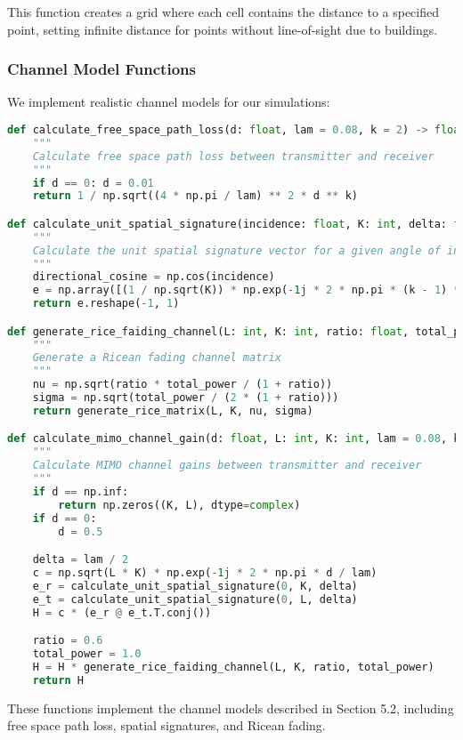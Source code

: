 This function creates a grid where each cell contains the distance to a specified point, setting infinite distance for points without line-of-sight due to buildings.

\subsubsection{Channel Model Functions}

We implement realistic channel models for our simulations:

\begin{lstlisting}[language=python, caption={Channel Modeling Functions}]
def calculate_free_space_path_loss(d: float, lam = 0.08, k = 2) -> float:
    """
    Calculate free space path loss between transmitter and receiver
    """
    if d == 0: d = 0.01
    return 1 / np.sqrt((4 * np.pi / lam) ** 2 * d ** k)

def calculate_unit_spatial_signature(incidence: float, K: int, delta: float):
    """
    Calculate the unit spatial signature vector for a given angle of incidence
    """
    directional_cosine = np.cos(incidence)
    e = np.array([(1 / np.sqrt(K)) * np.exp(-1j * 2 * np.pi * (k - 1) * delta * directional_cosine) for k in range(K)])
    return e.reshape(-1, 1)

def generate_rice_faiding_channel(L: int, K: int, ratio: float, total_power = 1.0) -> np.ndarray:
    """
    Generate a Ricean fading channel matrix
    """
    nu = np.sqrt(ratio * total_power / (1 + ratio))
    sigma = np.sqrt(total_power / (2 * (1 + ratio)))
    return generate_rice_matrix(L, K, nu, sigma)

def calculate_mimo_channel_gain(d: float, L: int, K: int, lam = 0.08, k = 2) -> tuple[np.ndarray, float]:
    """
    Calculate MIMO channel gains between transmitter and receiver
    """
    if d == np.inf:
        return np.zeros((K, L), dtype=complex)
    if d == 0:
        d = 0.5

    delta = lam / 2
    c = np.sqrt(L * K) * np.exp(-1j * 2 * np.pi * d / lam)
    e_r = calculate_unit_spatial_signature(0, K, delta)
    e_t = calculate_unit_spatial_signature(0, L, delta)
    H = c * (e_r @ e_t.T.conj())

    ratio = 0.6
    total_power = 1.0
    H = H * generate_rice_faiding_channel(L, K, ratio, total_power)
    return H
\end{lstlisting}

These functions implement the channel models described in Section 5.2, including free space path loss, spatial signatures, and Ricean fading.

